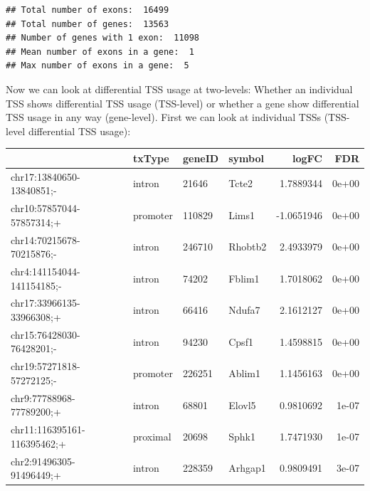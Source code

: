 \documentclass[9pt,a4paper,]{extarticle}
\newenvironment{Shaded}{\begin{snugshade}}{\end{snugshade}}
\newcommand{\KeywordTok}[1]{\textcolor[rgb]{0.13,0.29,0.53}{\textbf{{#1}}}}
\newcommand{\DataTypeTok}[1]{\textcolor[rgb]{0.13,0.29,0.53}{{#1}}}
\newcommand{\StringTok}[1]{\textcolor[rgb]{0.31,0.60,0.02}{{#1}}}
\newcommand{\NormalTok}[1]{{#1}}
\begin{document}
\begin{verbatim}
## Total number of exons:  16499 
## Total number of genes:  13563 
## Number of genes with 1 exon:  11098 
## Mean number of exons in a gene:  1 
## Max number of exons in a gene:  5
\end{verbatim}

Now we can look at differential TSS usage at two-levels: Whether an individual TSS shows differential TSS usage (TSS-level) or whether a gene show differential TSS usage in any way (gene-level). First we can look at individual TSSs (TSS-level differential TSS usage):

\begin{Shaded}
\end{Shaded}

\begin{tabular}{l|l|l|l|r|r}
\hline
  & txType & geneID & symbol & logFC & FDR\\
\hline
chr17:13840650-13840851;- & intron & 21646 & Tcte2 & 1.7889344 & 0e+00\\
\hline
chr10:57857044-57857314;+ & promoter & 110829 & Lims1 & -1.0651946 & 0e+00\\
\hline
chr14:70215678-70215876;- & intron & 246710 & Rhobtb2 & 2.4933979 & 0e+00\\
\hline
chr4:141154044-141154185;- & intron & 74202 & Fblim1 & 1.7018062 & 0e+00\\
\hline
chr17:33966135-33966308;+ & intron & 66416 & Ndufa7 & 2.1612127 & 0e+00\\
\hline
chr15:76428030-76428201;- & intron & 94230 & Cpsf1 & 1.4598815 & 0e+00\\
\hline
chr19:57271818-57272125;- & promoter & 226251 & Ablim1 & 1.1456163 & 0e+00\\
\hline
chr9:77788968-77789200;+ & intron & 68801 & Elovl5 & 0.9810692 & 1e-07\\
\hline
chr11:116395161-116395462;+ & proximal & 20698 & Sphk1 & 1.7471930 & 1e-07\\
\hline
chr2:91496305-91496449;+ & intron & 228359 & Arhgap1 & 0.9809491 & 3e-07\\
\hline
\end{tabular}
\end{document}
